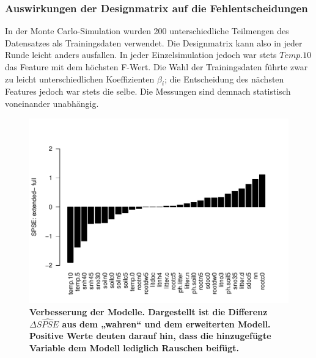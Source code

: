 \subsubsection{Auswirkungen der Designmatrix auf die Fehlentscheidungen}
In der Monte Carlo-Simulation wurden 200 unterschiedliche Teilmengen des Datensatzes als Trainingsdaten verwendet.
Die Designmatrix kann also in jeder Runde leicht anders ausfallen.
In jeder Einzelsimulation jedoch war stets $Temp.10$ das Feature mit dem höchsten F-Wert.
Die Wahl der Trainingsdaten führte zwar zu leicht unterschiedlichen Koeffizienten $\beta_i$; die Entscheidung des nächsten Features jedoch war stets die selbe.
Die Messungen sind demnach statistisch voneinander unabhängig.

\begin{figure}[htbp]
	\centering
	\includegraphics[width=\textwidth]{fig/simul/delta-spse.pdf}
	\caption{\bf{Verbesserung der Modelle.} 
		Dargestellt ist die Differenz $\Delta \widehat{SPSE}$ aus dem „wahren“ und dem erweiterten Modell.
		Positive Werte deuten darauf hin, dass die hinzugefügte Variable dem Modell lediglich Rauschen beifügt.
	}
	\label{fig-simul-delta-spse}
\end{figure}
